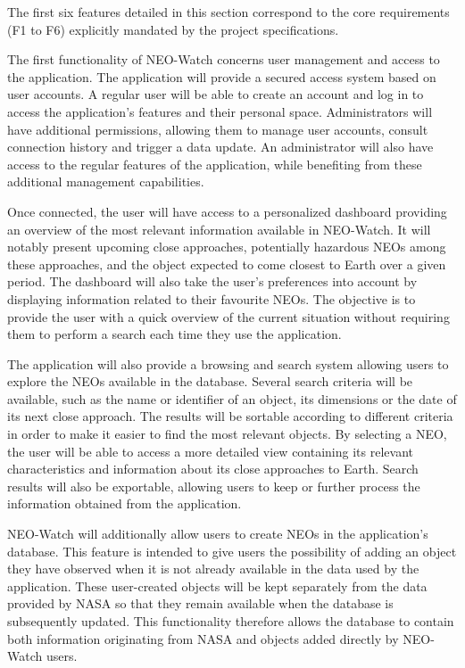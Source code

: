 The first six features detailed in this section correspond to the core requirements (F1 to F6) explicitly mandated by the project specifications.


\vspace{0.25cm}

The first functionality of NEO-Watch concerns user management and access to the application. The application will provide a secured access system based on user accounts. A regular user will be able to create an account and log in to access the application's features and their personal space. Administrators will have additional permissions, allowing them to manage user accounts, consult connection history and trigger a data update. An administrator will also have access to the regular features of the application, while benefiting from these additional management capabilities.


\vspace{0.25cm}


Once connected, the user will have access to a personalized dashboard providing an overview of the most relevant information available in NEO-Watch. It will notably present upcoming close approaches, potentially hazardous NEOs among these approaches, and the object expected to come closest to Earth over a given period. The dashboard will also take the user's preferences into account by displaying information related to their favourite NEOs. The objective is to provide the user with a quick overview of the current situation without requiring them to perform a search each time they use the application.


\vspace{0.25cm}

The application will also provide a browsing and search system allowing users to explore the NEOs available in the database. Several search criteria will be available, such as the name or identifier of an object, its dimensions or the date of its next close approach. The results will be sortable according to different criteria in order to make it easier to find the most relevant objects. By selecting a NEO, the user will be able to access a more detailed view containing its relevant characteristics and information about its close approaches to Earth. Search results will also be exportable, allowing users to keep or further process the information obtained from the application.

\vspace{0.25cm}

NEO-Watch will additionally allow users to create NEOs in the application's database. This feature is intended to give users the possibility of adding an object they have observed when it is not already available in the data used by the application. These user-created objects will be kept separately from the data provided by NASA so that they remain available when the database is subsequently updated. This functionality therefore allows the database to contain both information originating from NASA and objects added directly by NEO-Watch users.


